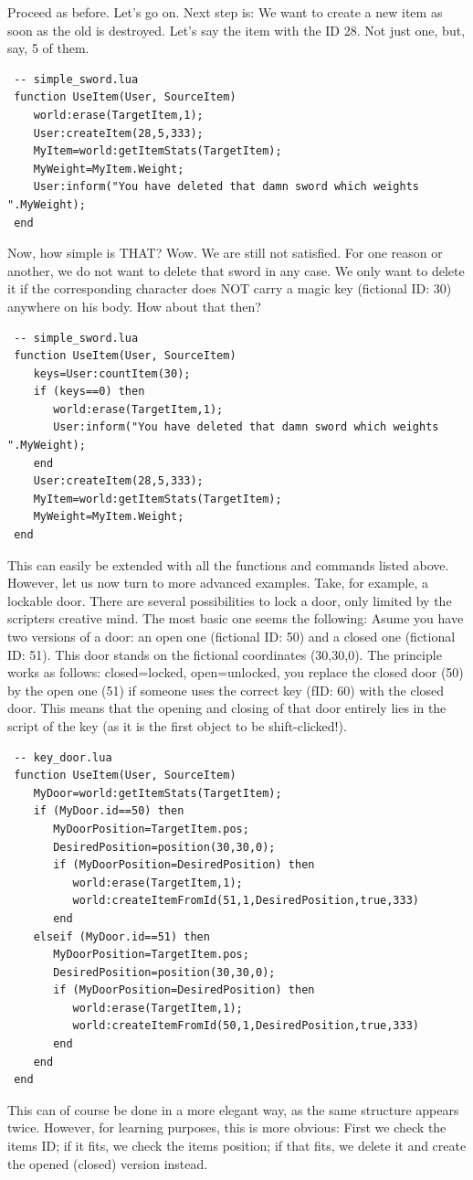 \documentclass[a4paper,10pt,makeidx]{scrreprt}
\begin{document}
Proceed as before.
Let's go on. Next step is: We want to create a new item as soon as the old is destroyed. Let's say the item with the ID 28. Not just one, but, say, 5 of them.
\begin{verbatim}
 -- simple_sword.lua
 function UseItem(User, SourceItem)
    world:erase(TargetItem,1);
    User:createItem(28,5,333);
    MyItem=world:getItemStats(TargetItem);
    MyWeight=MyItem.Weight;
    User:inform("You have deleted that damn sword which weights ".MyWeight);
 end
 \end{verbatim}
Now, how simple is THAT? Wow.
We are still not satisfied. For one reason or another, we do not want to delete that sword in any case. We only want to delete it if the corresponding character does NOT carry a magic key (fictional ID: 30) anywhere on his body. How about that then?
\begin{verbatim}
 -- simple_sword.lua
 function UseItem(User, SourceItem)
    keys=User:countItem(30);
    if (keys==0) then
       world:erase(TargetItem,1);
       User:inform("You have deleted that damn sword which weights ".MyWeight);
    end
    User:createItem(28,5,333);
    MyItem=world:getItemStats(TargetItem);
    MyWeight=MyItem.Weight;
 end
 \end{verbatim}
This can easily be extended with all the functions and commands listed above. However, let us now turn to more advanced examples. Take, for example, a lockable door. There are several possibilities to lock a door, only limited by the scripters creative mind. The most basic one seems the following: Asume you have two versions of a door: an open one (fictional ID: 50) and a closed one (fictional ID: 51). This door stands on the fictional coordinates (30,30,0). The principle works as follows: closed=locked, open=unlocked, you replace the closed door (50) by the open one (51) if someone uses the correct key (fID: 60) with the closed door. This means that the opening and closing of that door entirely lies in the script of the key (as it is the first object to be shift-clicked!).
\begin{verbatim}
 -- key_door.lua
 function UseItem(User, SourceItem)
    MyDoor=world:getItemStats(TargetItem);
    if (MyDoor.id==50) then
       MyDoorPosition=TargetItem.pos;
       DesiredPosition=position(30,30,0);
       if (MyDoorPosition=DesiredPosition) then
          world:erase(TargetItem,1);
          world:createItemFromId(51,1,DesiredPosition,true,333)
       end
    elseif (MyDoor.id==51) then
       MyDoorPosition=TargetItem.pos;
       DesiredPosition=position(30,30,0);
       if (MyDoorPosition=DesiredPosition) then
          world:erase(TargetItem,1);
          world:createItemFromId(50,1,DesiredPosition,true,333)
       end
    end
 end
 \end{verbatim}
This can of course be done in a more elegant way, as the same structure appears twice. However, for learning purposes, this is more obvious: First we check the items ID; if it fits, we check the items position; if that fits, we delete it and create the opened (closed) version instead.
\end{document}
